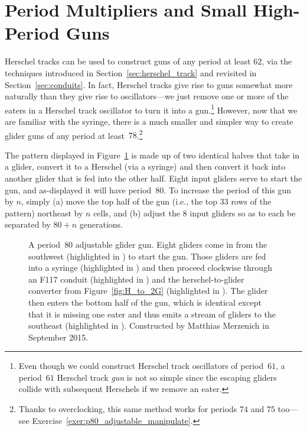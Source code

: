 \section{Period Multipliers and Small High-Period Guns}\label{sec:large_glider_guns}

Herschel tracks can be used to construct guns of any period at least $62$, via the techniques introduced in Section~\ref{sec:herschel_track} and revisited in Section~\ref{sec:conduits}. In fact, Herschel tracks give rise to guns somewhat more naturally than they give rise to oscillators---we just remove one or more of the eaters in a Herschel track oscillator to turn it into a gun.\footnote{Even though we could construct Herschel track oscillators of period~$61$, a period~$61$ Herschel track \emph{gun} is not so simple since the escaping gliders collide with subsequent Herschels if we remove an eater.} However, now that we are familiar with the syringe, there is a much smaller and simpler way to create glider guns of any period at least~$78$.\footnote{Thanks to overclocking, this same method works for periods $74$ and $75$ too---see Exercise~\ref{exer:p80_adjustable_manipulate}.}

The pattern displayed in Figure~\ref{fig:p80_adjustable_gun} is made up of two identical halves that take in a glider, convert it to a Herschel (via a syringe) and then convert it back into another glider that is fed into the other half. Eight input gliders serve to start the gun, and as-displayed it will have period~$80$. To increase the period of this gun by $n$, simply (a) move the top half of the gun (i.e., the top $33$ rows of the pattern) northeast by $n$ cells, and (b) adjust the $8$ input gliders so as to each be separated by $80+n$ generations.

\begin{figure}[!htb]
	\centering
	\caption{A period~$80$ adjustable glider gun. Eight gliders come in from the southwest (highlighted in ) to start the gun. Those gliders are fed into a syringe (highlighted in ) and then proceed clockwise through an F117 conduit (highlighted in ) and the herschel-to-glider converter from Figure~\ref{fig:H_to_2G} (highlighted in ). The glider then enters the bottom half of the gun, which is identical except that it is missing one eater and thus emits a stream of gliders to the southeast (highlighted in ). Constructed by Matthias Merzenich in September 2015.}\label{fig:p80_adjustable_gun}
\end{figure}

